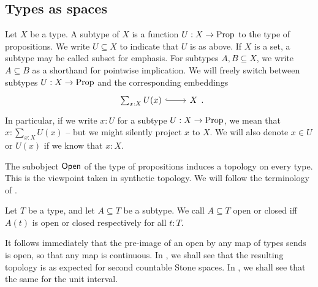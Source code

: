 \subsection{Types as spaces}
\begin{definition}
  Let $X$ be a type.
  A {subtype} of $X$ is a function $U:X\to\mathrm{Prop}$ to the type of propositions.
  We write $U\subseteq X$ to indicate that $U$ is as above.
  If $X$ is a set, a subtype may be called {subset} for emphasis.
  For subtypes $A,B\subseteq X$, 
  we write $A\subseteq B$ as a shorthand for pointwise implication.
  We will freely switch between subtypes $U:X\to\mathrm{Prop}$ and the corresponding embeddings
\[
  \begin{tikzcd}
    \sum_{x:X}U(x) \ar[r,hook] & X
  \end{tikzcd}
  \rlap{.}
\]
In particular, if we write $x:U$ for a subtype $U:X\to\mathrm{Prop}$, 
we mean that $x:\sum_{x:X}U(x)$ -- but we might silently project $x$ to $X$.
We will also denote $x\in U$ or $U(x)$ if we know that $x:X$. 
\end{definition}


The subobject $\mathsf{Open}$ of the type of propositions induces a topology on every type. 
This is the viewpoint taken in synthetic topology. 
We will follow the terminology of \cite{SyntheticTopologyEscardo, SyntheticTopologyLesnik}. 

\begin{definition}
  Let $T$ be a type, and let $A\subseteq T$ be a subtype. 
  We call $A\subseteq T$ open or closed iff $A(t)$ is open or closed respectively for all $t:T$.
\end{definition}

\begin{remark}
  It follows immediately that the pre-image of an open by any map of types sends is open, so that any map is continuous. 
  In , we shall see that the resulting topology is as expected for second countable Stone spaces.
  In , we shall see that the same for the unit interval. 
\end{remark}



